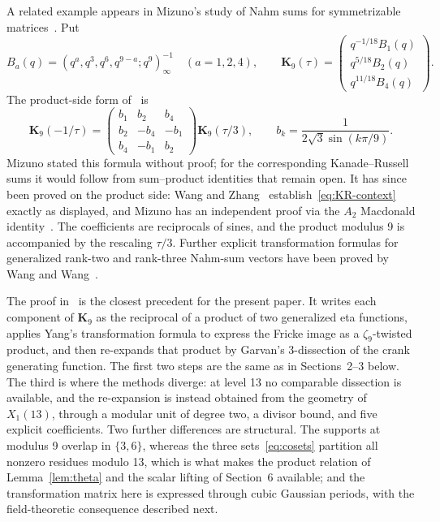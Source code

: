 \documentclass[11pt]{amsart}
\theoremstyle{remark}
\begin{document}
A related example appears in Mizuno's study of Nahm sums for
symmetrizable matrices~\cite{Mizuno}. Put
\[
 B_a(q)=(q^a,q^3,q^6,q^{9-a};q^9)_\infty^{-1}\quad(a=1,2,4),
 \qquad
 \mathbf K_9(\tau)=
 \begin{pmatrix}q^{-1/18}B_1(q)\\q^{5/18}B_2(q)\\q^{11/18}B_4(q)\end{pmatrix}.
\]
The product-side form of~\cite[(9)]{Mizuno} is
\begin{equation}\label{eq:KR-context}
 \mathbf K_9(-1/\tau)=
 \begin{pmatrix}
 b_1&b_2&b_4\\b_2&-b_4&-b_1\\b_4&-b_1&b_2
 \end{pmatrix}\mathbf K_9(\tau/3),\qquad
 b_k=\frac1{2\sqrt3\sin(k\pi/9)}.
\end{equation}
Mizuno stated this formula without proof; for the corresponding
Kanade--Russell sums it would follow from sum--product identities that
remain open. It has since been proved on the product side: Wang and
Zhang~\cite[Theorem 1.1]{WZ} establish~\eqref{eq:KR-context} exactly as
displayed, and Mizuno has an independent proof via the $A_2$ Macdonald
identity~\cite[Remark 2]{WZ}. The coefficients are reciprocals of sines,
and the product modulus 9 is accompanied by the rescaling $\tau/3$.
Further explicit transformation formulas for generalized rank-two and
rank-three Nahm-sum vectors have been proved by Wang and
Wang~\cite{WW2,WW3}.

The proof in~\cite{WZ} is the closest precedent for the present paper. It
writes each component of $\mathbf K_9$ as the reciprocal of a product of
two generalized eta functions, applies Yang's transformation formula to
express the Fricke image as a $\zeta_9$-twisted product, and then
re-expands that product by Garvan's 3-dissection of the crank generating
function. The first two steps are the same as in Sections~2--3 below. The
third is where the methods diverge: at level 13 no comparable dissection
is available, and the re-expansion is instead obtained from the geometry
of $X_1(13)$, through a modular unit of degree two, a divisor bound, and
five explicit coefficients. Two further differences are structural. The
supports at modulus 9 overlap in $\{3,6\}$, whereas the three
sets~\eqref{eq:cosets} partition all nonzero residues modulo 13, which is
what makes the product relation of Lemma~\ref{lem:theta} and the scalar
lifting of Section~6 available; and the transformation matrix here is
expressed through cubic Gaussian periods, with the field-theoretic
consequence described next.
\end{document}
